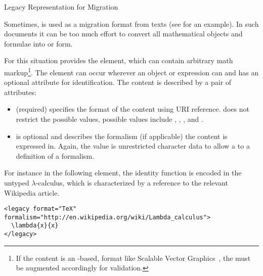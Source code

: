\begin{omgroup}[id=mobj,short=Mathematical Objects]
\begin{module}[id=legacy]
\begin{omgroup}[id=legacy]{Legacy Representation for Migration}

  Sometimes, \omdoc is used as a migration format from {} texts (see
  {} for an example). In such documents it can be too much effort
  to convert all mathematical objects and formulae into {\openmath} or {\cmathml} form.

\begin{definition}[id=legacy.def]
  For this situation \omdoc provides the {} element, which can contain
  arbitrary math markup\footnote{If the content is an {\xml}-based, format like Scalable
    Vector Graphics~\cite{W3C:svg02}, the {} must be augmented accordingly
    for validation.}. The  element can occur wherever an {\openmath}
  object or {\cmathml} expression can and has an optional
   attribute for identification. The content is
  described by a pair of attributes:
  \begin{itemize}
  \item {} (required) specifies the format of the content using
    URI reference. \omdoc does not restrict the possible values, possible values include
    , ,
    , and .
  \item {} is optional and describes the formalism (if
    applicable) the content is expressed in. Again, the value is unrestricted character
    data to allow a {} to a definition of a formalism.
  \end{itemize}
\end{definition}

For instance in the following  element, the identity function is encoded
in the untyped $\lambda$-calculus, which is characterized by a reference to the relevant
Wikipedia article.

\begin{lstlisting}[index={legacy}]
<legacy format="TeX" formalism="http://en.wikipedia.org/wiki/Lambda_calculus">
  \lambda{x}{x}
</legacy>
\end{lstlisting}
\end{omgroup}
\end{module}
\end{omgroup}

